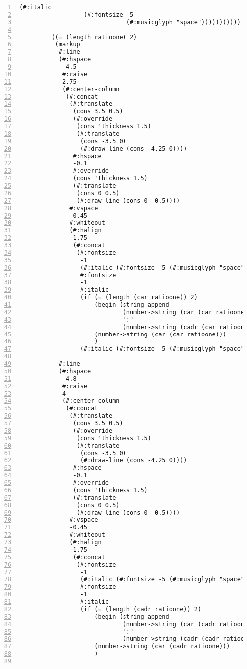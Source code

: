 \begin{Verbatim}[numbers=left,xleftmargin=5mm]
                 (#:italic
                  (#:fontsize -5
                              (#:musicglyph "space")))))))))))

         ((= (length ratioone) 2)
          (markup
           #:line
           (#:hspace
            -4.5
            #:raise
            2.75
            (#:center-column
             (#:concat
              (#:translate
               (cons 3.5 0.5)
               (#:override
                (cons 'thickness 1.5)
                (#:translate
                 (cons -3.5 0)
                 (#:draw-line (cons -4.25 0))))
               #:hspace
               -0.1
               #:override
               (cons 'thickness 1.5)
               (#:translate
                (cons 0 0.5)
                (#:draw-line (cons 0 -0.5))))
              #:vspace
              -0.45
              #:whiteout
              (#:halign
               1.75
               (#:concat
                (#:fontsize
                 -1
                 (#:italic (#:fontsize -5 (#:musicglyph "space")))
                 #:fontsize
                 -1
                 #:italic
                 (if (= (length (car ratioone)) 2)
                     (begin (string-append
                             (number->string (car (car ratioone)))
                             ":"
                             (number->string (cadr (car ratioone)))))
                     (number->string (car (car ratioone)))
                     )
                 (#:italic (#:fontsize -5 (#:musicglyph "space")))))))))

           #:line
           (#:hspace
            -4.8
            #:raise
            4
            (#:center-column
             (#:concat
              (#:translate
               (cons 3.5 0.5)
               (#:override
                (cons 'thickness 1.5)
                (#:translate
                 (cons -3.5 0)
                 (#:draw-line (cons -4.25 0))))
               #:hspace
               -0.1
               #:override
               (cons 'thickness 1.5)
               (#:translate
                (cons 0 0.5)
                (#:draw-line (cons 0 -0.5))))
              #:vspace
              -0.45
              #:whiteout
              (#:halign
               1.75
               (#:concat
                (#:fontsize
                 -1
                 (#:italic (#:fontsize -5 (#:musicglyph "space")))
                 #:fontsize
                 -1
                 #:italic
                 (if (= (length (cadr ratioone)) 2)
                     (begin (string-append
                             (number->string (car (cadr ratioone)))
                             ":"
                             (number->string (cadr (cadr ratioone))))  )
                     (number->string (car (cadr ratioone)))
                     )


\end{Verbatim}
